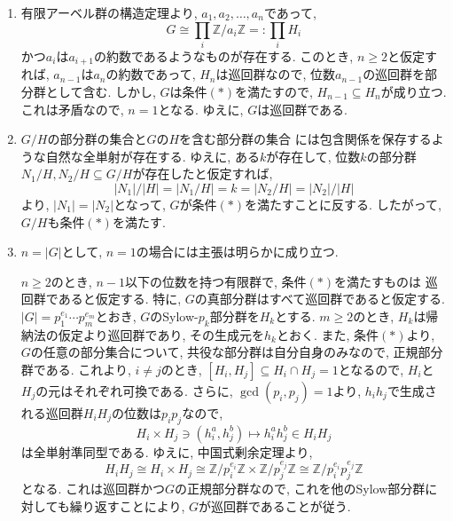 \documentclass[dvipdfmx]{jsarticle}
\begin{document}
  \begin{enumerate}
    \item 有限アーベル群の構造定理より, $a_1, a_2, \dots, a_n$であって,
    \[
      G \cong \prod_i \mathbb{Z}/a_i\mathbb{Z} =: \prod_i H_{i}
    \]
    かつ$a_{i}$は$a_{i+1}$の約数であるようなものが存在する.
    このとき, $n \geq 2$と仮定すれば, $a_{n-1}$は$a_n$の約数であって, $H_{n}$は巡回群なので,
    位数$a_{n-1}$の巡回群を部分群として含む.
    しかし, $G$は条件$(\ast)$を満たすので, $H_{n-1} \subseteq H_{n}$が成り立つ.
    これは矛盾なので, $n = 1$となる.
    ゆえに, $G$は巡回群である.
    \item $G/H$の部分群の集合と$G$の$H$を含む部分群の集合
    には包含関係を保存するような自然な全単射が存在する.
    ゆえに, ある$k$が存在して, 位数$k$の部分群$N_1/H, N_2/H \subseteq G/H$が存在したと仮定すれば,
    \[
      |N_1|/|H| = |N_1/H| = k = |N_2/H| = |N_2|/|H|
    \]
    より, $|N_1| = |N_2|$となって, $G$が条件$(\ast)$を満たすことに反する.
    したがって, $G/H$も条件$(\ast)$を満たす.
    \item $n = |G|$として, $n = 1$の場合には主張は明らかに成り立つ.

    $n \geq 2$のとき, $n-1$以下の位数を持つ有限群で, 条件$(\ast)$を満たすものは
    巡回群であると仮定する.
    特に, $G$の真部分群はすべて巡回群であると仮定する.
    $|G| = p_1^{e_1}\cdots p_m^{e_m}$とおき, $G$のSylow-$p_k$部分群を$H_k$とする.
    $m \geq 2$のとき, $H_k$は帰納法の仮定より巡回群であり, その生成元を$h_k$とおく.
    また, 条件$(\ast)$より, $G$の任意の部分集合について, 共役な部分群は自分自身のみなので, 正規部分群である.
    これより, $i \neq j$のとき, $[H_i, H_j] \subseteq H_i \cap H_j = 1$となるので, $H_i$と$H_j$の元はそれぞれ可換である.
    さらに, $\gcd(p_i, p_j) = 1$より, $h_ih_j$で生成される巡回群$H_iH_j$の位数は$p_ip_j$なので,
    \[
      H_i \times H_j \ni (h_i^a, h_j^b) \longmapsto h_i^ah_j^b \in H_iH_j
    \]
    は全単射準同型である.
    ゆえに, 中国式剰余定理より,
    \[
      H_iH_j \cong H_i \times H_j \cong \mathbb{Z}/p_i^{e_i}\mathbb{Z} \times \mathbb{Z}/p_j^{e_j}\mathbb{Z} \cong \mathbb{Z}/p_i^{e_i}p_j^{e_j}\mathbb{Z}
    \]
    となる.
    これは巡回群かつ$G$の正規部分群なので, これを他のSylow部分群に対しても繰り返すことにより,
    $G$が巡回群であることが従う.
  \end{enumerate}
\end{document}
